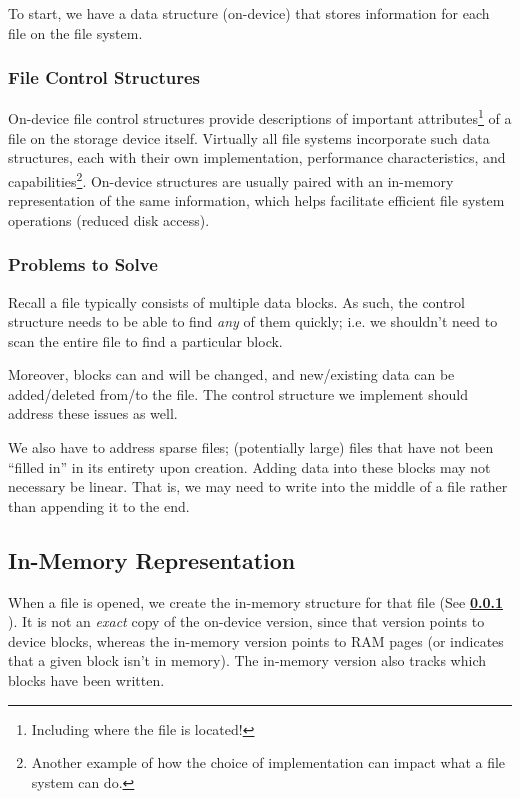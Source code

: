 \documentclass{report}
\newcommand{\refto}[2]{\textbf{\ref{#1:#2} \nameref{#1:#2}}}
\begin{document}
To start, we have a data structure (on-device) that stores information for each file on the file
system. 


\subsubsection{File Control Structures}
\label{subsubsec:FCS}
On-device file control structures provide descriptions of important attributes\footnote{Including
  where the file is located!} of a file on the storage device itself. Virtually all file systems
incorporate such data structures, each with their own implementation, performance characteristics,
and capabilities\footnote{Another example of how the choice of implementation can impact what a file
  system can do.}. On-device structures are usually paired with an in-memory representation of the
same information, which helps facilitate efficient file system operations (reduced disk access).


\subsubsection{Problems to Solve}
Recall a file typically consists of multiple data blocks. As such, the control structure needs to be
able to find \textit{any} of them quickly; i.e. we shouldn't need to scan the entire file to find a
particular block.

Moreover, blocks can and will be changed, and new/existing data can be added/deleted from/to the
file. The control structure we implement should address these issues as well.

We also have to address sparse files; (potentially large) files that have not been ``filled in'' in
its entirety upon creation. Adding data into these blocks may not necessary be linear. That is, we
may need to write into the middle of a file rather than appending it to the end.


\subsection{In-Memory Representation}
When a file is opened, we create the in-memory structure for that file (See \refto{subsubsec}{FCS}). It
is not an \textit{exact} copy of the on-device version, since that version points to device blocks,
whereas the in-memory version points to RAM pages (or indicates that a given block isn't in
memory). The in-memory version also tracks which blocks have been written.
\end{document}
